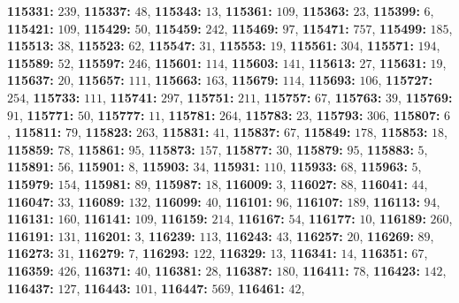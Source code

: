 \textsf{\bfseries 115331:} $239$, \textsf{\bfseries 115337:} $48$, \textsf{\bfseries 115343:} $13$, \textsf{\bfseries 115361:} $109$, \textsf{\bfseries 115363:} $23$, \textsf{\bfseries 115399:} $6$, \textsf{\bfseries 115421:} $109$, \textsf{\bfseries 115429:} $50$, \textsf{\bfseries 115459:} $242$, \textsf{\bfseries 115469:} $97$, \textsf{\bfseries 115471:} $757$, \textsf{\bfseries 115499:} $185$, \textsf{\bfseries 115513:} $38$, \textsf{\bfseries 115523:} $62$, \textsf{\bfseries 115547:} $31$, \textsf{\bfseries 115553:} $19$, \textsf{\bfseries 115561:} $304$, \textsf{\bfseries 115571:} $194$, \textsf{\bfseries 115589:} $52$, \textsf{\bfseries 115597:} $246$, \textsf{\bfseries 115601:} $114$, \textsf{\bfseries 115603:} $141$, \textsf{\bfseries 115613:} $27$, \textsf{\bfseries 115631:} $19$, \textsf{\bfseries 115637:} $20$, \textsf{\bfseries 115657:} $111$, \textsf{\bfseries 115663:} $163$, \textsf{\bfseries 115679:} $114$, \textsf{\bfseries 115693:} $106$, \textsf{\bfseries 115727:} $254$, \textsf{\bfseries 115733:} $111$, \textsf{\bfseries 115741:} $297$, \textsf{\bfseries 115751:} $211$, \textsf{\bfseries 115757:} $67$, \textsf{\bfseries 115763:} $39$, \textsf{\bfseries 115769:} $91$, \textsf{\bfseries 115771:} $50$, \textsf{\bfseries 115777:} $11$, \textsf{\bfseries 115781:} $264$, \textsf{\bfseries 115783:} $23$, \textsf{\bfseries 115793:} $306$, \textsf{\bfseries 115807:} $6$, \textsf{\bfseries 115811:} $79$, \textsf{\bfseries 115823:} $263$, \textsf{\bfseries 115831:} $41$, \textsf{\bfseries 115837:} $67$, \textsf{\bfseries 115849:} $178$, \textsf{\bfseries 115853:} $18$, \textsf{\bfseries 115859:} $78$, \textsf{\bfseries 115861:} $95$, \textsf{\bfseries 115873:} $157$, \textsf{\bfseries 115877:} $30$, \textsf{\bfseries 115879:} $95$, \textsf{\bfseries 115883:} $5$, \textsf{\bfseries 115891:} $56$, \textsf{\bfseries 115901:} $8$, \textsf{\bfseries 115903:} $34$, \textsf{\bfseries 115931:} $110$, \textsf{\bfseries 115933:} $68$, \textsf{\bfseries 115963:} $5$, \textsf{\bfseries 115979:} $154$, \textsf{\bfseries 115981:} $89$, \textsf{\bfseries 115987:} $18$, \textsf{\bfseries 116009:} $3$, \textsf{\bfseries 116027:} $88$, \textsf{\bfseries 116041:} $44$, \textsf{\bfseries 116047:} $33$, \textsf{\bfseries 116089:} $132$, \textsf{\bfseries 116099:} $40$, \textsf{\bfseries 116101:} $96$, \textsf{\bfseries 116107:} $189$, \textsf{\bfseries 116113:} $94$, \textsf{\bfseries 116131:} $160$, \textsf{\bfseries 116141:} $109$, \textsf{\bfseries 116159:} $214$, \textsf{\bfseries 116167:} $54$, \textsf{\bfseries 116177:} $10$, \textsf{\bfseries 116189:} $260$, \textsf{\bfseries 116191:} $131$, \textsf{\bfseries 116201:} $3$, \textsf{\bfseries 116239:} $113$, \textsf{\bfseries 116243:} $43$, \textsf{\bfseries 116257:} $20$, \textsf{\bfseries 116269:} $89$, \textsf{\bfseries 116273:} $31$, \textsf{\bfseries 116279:} $7$, \textsf{\bfseries 116293:} $122$, \textsf{\bfseries 116329:} $13$, \textsf{\bfseries 116341:} $14$, \textsf{\bfseries 116351:} $67$, \textsf{\bfseries 116359:} $426$, \textsf{\bfseries 116371:} $40$, \textsf{\bfseries 116381:} $28$, \textsf{\bfseries 116387:} $180$, \textsf{\bfseries 116411:} $78$, \textsf{\bfseries 116423:} $142$, \textsf{\bfseries 116437:} $127$, \textsf{\bfseries 116443:} $101$, \textsf{\bfseries 116447:} $569$, \textsf{\bfseries 116461:} $42$, 
